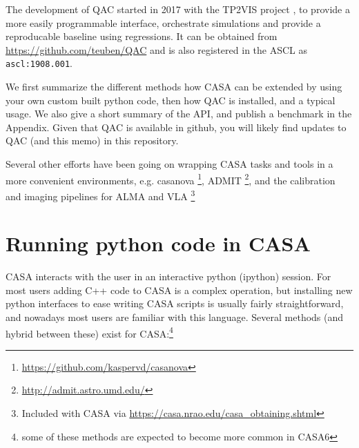 \documentclass[12pt,a4paper]{article}
\begin{document}


The development of QAC started in 2017 with the TP2VIS project \citep{tp2vis}, to provide a
more easily programmable interface, orchestrate simulations and provide a
reproducable baseline using regressions. It can be obtained from \url{https://github.com/teuben/QAC}
and is also registered in the ASCL as {\tt ascl:1908.001}.

We first summarize the different methods how CASA can be extended by using your own
custom built python code, then how QAC is installed, and a typical usage. We also give a short
summary of the API, and publish a benchmark in the Appendix. Given that QAC is available
in github, you will likely find updates to QAC (and this memo) in this repository.


Several other efforts have been going on wrapping CASA tasks and tools in a more
convenient environments, e.g. casanova
\footnote{\url{https://github.com/kaspervd/casanova}}, ADMIT
\footnote{\url{http://admit.astro.umd.edu/}}, and the calibration and imaging
pipelines for ALMA and VLA
\footnote{Included with CASA via \url{https://casa.nrao.edu/casa_obtaining.shtml}}



\section{Running python code in CASA}

CASA interacts with the user in an interactive python (ipython) session. For most users adding 
C++ code to CASA is a complex operation, but installing new python interfaces to ease writing CASA scripts
is usually fairly straightforward, and nowadays most users are familiar with this language.
Several methods (and hybrid between these) exist
for CASA:\footnote{some of these methods are expected to become more common in CASA6}
\end{document}
